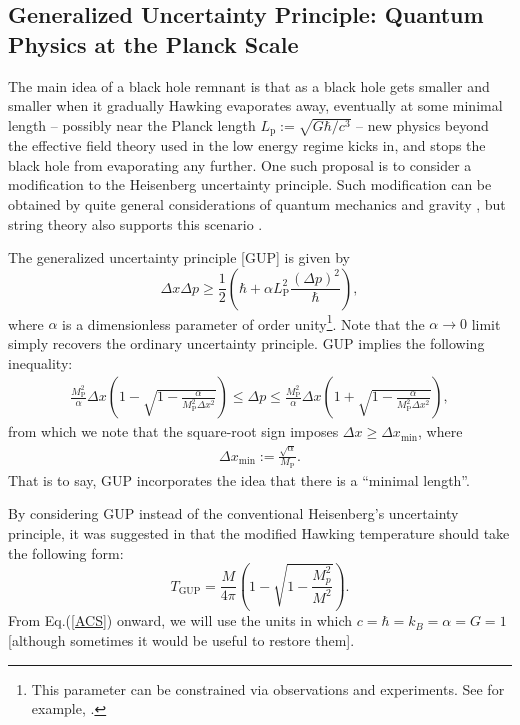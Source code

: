 \documentclass[12pt]{article}
\newcommand{\2}{$^2$}
\newcommand{\3}{$^3$}
\newcommand{\4}{$_4$}
\newcommand{\5}{$_5$}
\begin{document}
\subsection{Generalized Uncertainty Principle: Quantum Physics at the Planck Scale}

The main idea of a black hole remnant is that as a black hole gets smaller and smaller when it gradually Hawking evaporates away, eventually at some minimal length -- possibly near the Planck length $L_\text{p} := \sqrt{G\hbar/c^3}$ -- new physics beyond the effective field theory used in the low energy regime kicks in, and stops the black hole from evaporating any further. One such proposal is to consider a modification to the Heisenberg uncertainty principle. Such modification can be obtained by quite general considerations of quantum mechanics and gravity \cite{1, 2, 3, 4}, but string theory also supports this scenario \cite{5, 6, 7, 8, 9}. 

The generalized uncertainty principle [GUP] is given by
\begin{equation}\label{GUP}
\Delta x\Delta p \geqslant \frac{1}{2}\left(\hbar + \alpha L_{\text{P}}^2\frac{(\Delta p)^2}{\hbar}\right),
\end{equation}
where $\alpha$ is a dimensionless parameter of order unity\footnote{This parameter can be constrained via observations and experiments. See for example, \cite{SE1, FabioRoberto}.}. Note that the $\alpha \to 0$ limit simply recovers the ordinary uncertainty principle.
GUP implies the following inequality:
\begin{eqnarray}
\frac{M_{\mathrm{P}}^{2}}{\alpha} \Delta x \left( 1 - \sqrt{1 - \frac{\alpha}{M_{\mathrm{P}}^{2} \Delta x^{2}}} \right) \leqslant \Delta p \leqslant \frac{M_{\mathrm{P}}^{2}}{\alpha} \Delta x \left( 1 + \sqrt{1 - \frac{\alpha}{M_{\mathrm{P}}^{2} \Delta x^{2}}} \right),
\end{eqnarray}
from which we note that the square-root sign imposes $\Delta x \geqslant \Delta x_{\mathrm{min}}$, where
\begin{eqnarray}
\Delta x_{\mathrm{min}} := \frac{\sqrt{\alpha}}{M_{\mathrm{P}}}.
\end{eqnarray}
That is to say, GUP incorporates the idea that there is a ``minimal length''.

By considering GUP instead of the conventional Heisenberg's uncertainty principle, it was suggested in \cite{pisin} that the modified Hawking temperature should take the following form:
\begin{equation}\label{ACS}
T_{\text{GUP}} = \frac{M}{4\pi}\left(1-\sqrt{1-\frac{M_p^2}{M^2}}\right).
\end{equation}
From Eq.(\ref{ACS}) onward, we will use the units in which $c=\hbar=k_B=\alpha=G=1$ [although sometimes it would be useful to restore them]. 
\end{document}
